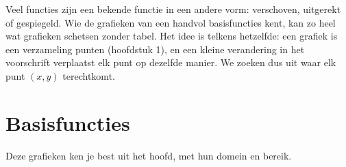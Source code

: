 %



Veel functies zijn een bekende functie in een andere vorm: verschoven, uitgerekt of gespiegeld. Wie de grafieken van een handvol basisfuncties kent, kan zo heel wat grafieken schetsen zonder tabel. Het idee is telkens hetzelfde: een grafiek is een verzameling punten (hoofdstuk 1), en een kleine verandering in het voorschrift verplaatst elk punt op dezelfde manier. We zoeken dus uit waar elk punt $(x, y)$ terechtkomt.

\begin{oefeningen}[Start]

\end{oefeningen}

\section{Basisfuncties}

Deze grafieken ken je best uit het hoofd, met hun domein en bereik.

